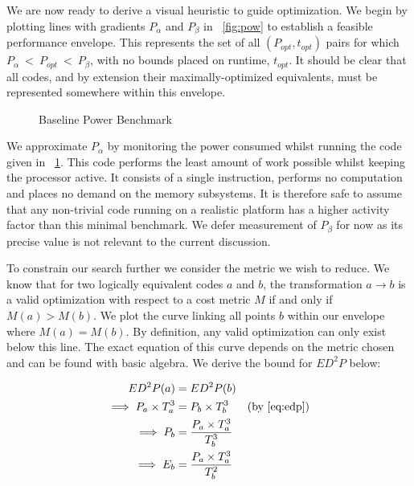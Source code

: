 We are now ready to derive a visual heuristic to guide optimization. We begin by plotting lines with gradients $P_{\alpha}$ and $P_{\beta}$ in \figurename~\ref{fig:pow} to establish a feasible performance envelope. This represents the set of all $(P_{opt}, t_{opt})$ pairs for which $P_{\alpha}~<~P_{opt}~<~P_{\beta}$, with no bounds placed on runtime, $t_{opt}$. It should be clear that all codes,  and by extension their maximally-optimized equivalents, must be represented somewhere within this envelope.

\begin{figure}[ht]                                                               
\centering                                                                      
\lstset{basicstyle=\ttfamily\footnotesize\bfseries,                             
      frame=tb}                                                                 
                             
\caption{Baseline Power Benchmark}                            
\label{fig:nopjmpres}                                                           
\end{figure}  

We approximate $P_{\alpha}$ by monitoring the power consumed whilst running the code given in \figurename~\ref{fig:nopjmpres}. This code performs the least amount of work possible whilst keeping the processor active. It consists of a single instruction, performs no computation and places no demand on the memory subsystems. It is therefore safe to assume that any non-trivial code running on a realistic platform has a higher activity factor than this minimal benchmark. We defer measurement of $P_{\beta}$ for now as its precise value is not relevant to the current discussion.

To constrain our search further we consider the metric we wish to reduce. We know that for two logically equivalent codes $a$ and $b$, the transformation $a \to b$ is a valid optimization with respect to a cost metric $M$ if and only if $M(a) > M(b)$. We plot the curve linking all points $b$ within our envelope where $M(a) = M(b)$. By definition, any valid optimization can only exist below this line. The exact equation of this curve depends on the metric chosen and can be found with basic algebra. We derive the bound for $ED^2P$ below:

\begin{align}
ED^2P(a) &= ED^2P(b) \nonumber \\
\implies P_{a} \times T_{a}^{3} &= P_{b} \times T_{b}^{3} \nonumber & \text{(by \ref{eq:edp})}\\
\implies P_{b} &= \frac{P_{a} \times T_{a}^{3}}{T_{b}^3} \nonumber \\
\implies E_{b} &= \frac{P_{a} \times T_{a}^{3}}{T_{b}^2}
\end{align}


